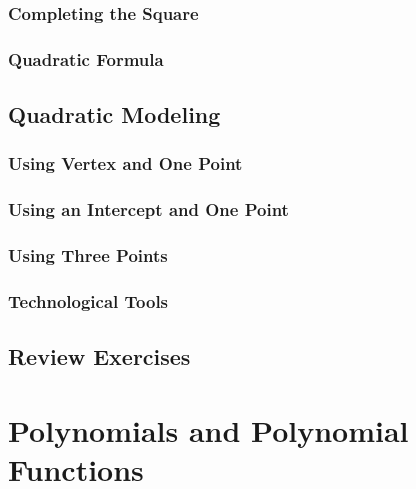 \documentclass[]{book}
\begin{document}
\hypertarget{completing-the-square}{%
\subsection{Completing the Square}\label{completing-the-square}}

\hypertarget{quadratic-formula}{%
\subsection{Quadratic Formula}\label{quadratic-formula}}

\hypertarget{quadratic-modeling}{%
\section{Quadratic Modeling}\label{quadratic-modeling}}

\hypertarget{using-vertex-and-one-point}{%
\subsection{Using Vertex and One Point}\label{using-vertex-and-one-point}}

\hypertarget{using-an-intercept-and-one-point}{%
\subsection{Using an Intercept and One Point}\label{using-an-intercept-and-one-point}}

\hypertarget{using-three-points}{%
\subsection{Using Three Points}\label{using-three-points}}

\hypertarget{technological-tools}{%
\subsection{Technological Tools}\label{technological-tools}}

\hypertarget{review-exercises}{%
\section{Review Exercises}\label{review-exercises}}

\hypertarget{Polynomials}{%
\chapter{Polynomials and Polynomial Functions}\label{Polynomials}}
\end{document}
